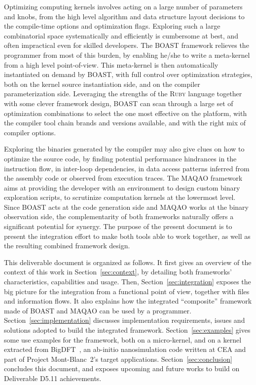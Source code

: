 \documentclass[11pt, a4paper, twoside]{montblanc2}
\def\ruby{\textsc{Ruby}\xspace}
\begin{document}
Optimizing computing kernels involves acting on a large number of parameters and 
knobs, from the high level algorithm and data structure layout decisions to the 
compile-time options and optimization flags. Exploring such a large 
combinatorial space systematically and efficiently is cumbersome at best, and 
often impractical even for skilled developers. The BOAST framework relieves the 
programmer from most of this burden, by enabling he/she to write a meta-kernel 
from a high level point-of-view. This meta-kernel is then automatically 
instantiated on demand by BOAST, with full control over optimization strategies, 
both on the kernel source instantiation side, and on the compiler 
parameterization side. Leveraging the strengths of the \ruby language together with 
some clever framework design, BOAST can scan through a large set of optimization 
combinations to select the one most effective on the platform, with the compiler 
tool chain brands and versions available, and with the right mix of compiler 
options.

Exploring the binaries generated by the compiler may also give clues on how to 
optimize the source code, by finding potential performance hindrances in the 
instruction flow, in inter-loop dependencies, in data access patterns inferred 
from the assembly code or observed from execution traces. The MAQAO framework aims 
at providing the developer with an environment to design custom binary 
exploration scripts, to scrutinize computation kernels at the lowermost level. 
Since BOAST acts at the code generation side and MAQAO works at the binary observation 
side, the complementarity of both frameworks naturally offers a significant 
potential for synergy. The purpose of the present document is to present the 
integration effort to make both tools able to work together, as well as the 
resulting combined framework design.

This deliverable document is organized as follows. It first gives an overview of 
the context of this work in Section~\ref{sec:context}, by detailing both 
frameworks' characteristics, capabilities and usage. Then, 
Section~\ref{sec:integration} exposes the big picture for the integration from a 
functional point of view, together with files and information flows. It also 
explains how the integrated ``composite'' framework made of BOAST and MAQAO can 
be used by a programmer. Section~\ref{sec:implementation} discusses 
implementation requirements, issues and solutions adopted to build the 
integrated framework. Section~\ref{sec:examples} gives some use examples for the 
framework, both on a micro-kernel, and on a kernel extracted from
BigDFT~\cite{genovese:bigdft:jcp:2008}, an ab-initio nanosimulation code
written at CEA and part of Project Mont-Blanc~2's target applications.
Section~\ref{sec:conclusion} concludes this document, and exposes upcoming and
future works to build on Deliverable D5.11 achievements.
\end{document}
